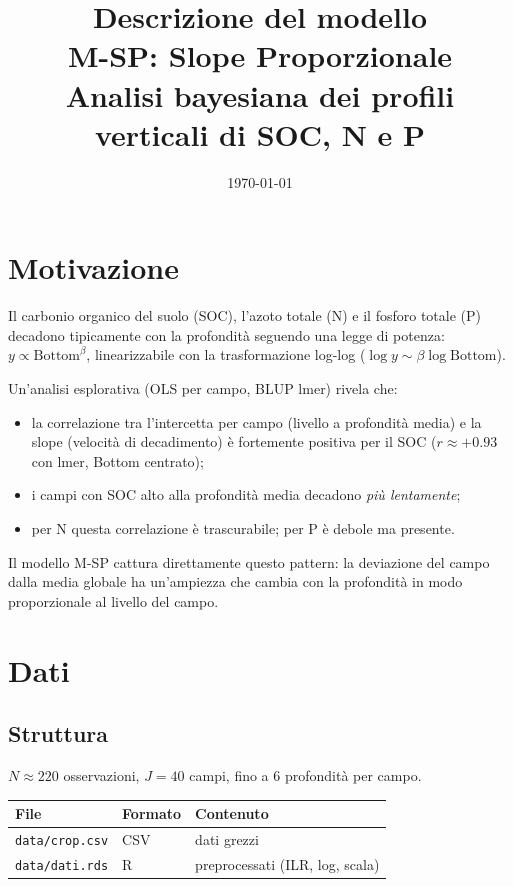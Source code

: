 \documentclass[11pt, a4paper]{article}
\title{%
  {\large Descrizione del modello}\\[4pt]
  {\LARGE\color{myblue} M-SP: Slope Proporzionale}\\[4pt]
  {\normalsize Analisi bayesiana dei profili verticali di SOC, N e P}
}
\author{}
\date{\today}
\begin{document}
\maketitle
\thispagestyle{empty}
\tableofcontents
\bigskip

\section{Motivazione}

Il carbonio organico del suolo (SOC), l'azoto totale (N) e il fosforo totale (P)
decadono tipicamente con la profondità seguendo una legge di potenza:
$y \propto \text{Bottom}^{\beta}$, linearizzabile con la trasformazione log-log
($\log y \sim \beta \log\text{Bottom}$).

Un'analisi esplorativa (OLS per campo, BLUP lmer) rivela che:
\begin{itemize}
  \item la correlazione tra l'intercetta per campo (livello a profondità media)
        e la slope (velocità di decadimento) è fortemente positiva per il SOC
        ($r \approx {+}0.93$ con lmer, Bottom centrato);
  \item i campi con SOC alto alla profondità media decadono \emph{più lentamente};
  \item per N questa correlazione è trascurabile; per P è debole ma presente.
\end{itemize}

Il modello M-SP cattura direttamente questo pattern: la deviazione del campo
dalla media globale ha un'ampiezza che cambia con la profondità in modo
proporzionale al livello del campo.

\section{Dati}

\subsection{Struttura}

$N \approx 220$ osservazioni, $J = 40$ campi, fino a 6 profondità per campo.

\medskip
\begin{tabular}{@{}lll@{}}
\toprule
File & Formato & Contenuto \\
\midrule
\texttt{data/crop.csv} & CSV & dati grezzi \\
\texttt{data/dati.rds} & R & preprocessati (ILR, log, scala) \\
\bottomrule
\end{tabular}
\end{document}
